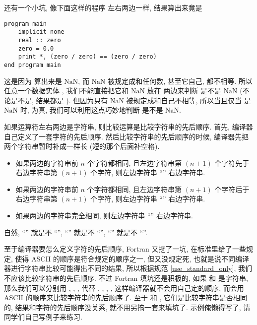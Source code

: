 还有一个小坑, 像下面这样的程序 \ttt{==} 左右两边一样, 结果算出来竟是 
\begin{lstlisting}
program main
    implicit none
    real :: zero
    zero = 0.0
    print *, (zero / zero) == (zero / zero)
end program main
\end{lstlisting}
这是因为  算出来是 $\text{NaN}$, 而 $\text{NaN}$ 被规定成和任何数, 甚至它自己, 都不相等. 所以任意一个数据实体 \ttt{[r]}, 我们不能直接把它和 $\text{NaN}$ 放在 \ttt{==} 两边来判断 \ttt{[r]} 是不是 $\text{NaN}$ (不论是不是, 结果都是 ). 但因为只有 $\text{NaN}$ 被规定成和自己不相等, 所以当且仅当 \ttt{[r]} 是 $\text{NaN}$ 时, \ttt{[r] /= [r]} 为真, 我们可以利用这点巧妙地判断 \ttt{[r]} 是不是 $\text{NaN}$.

如果运算符左右两边是字符串, 则比较运算是比较字符串的先后顺序. 首先, 编译器自己定义了一套字符的先后顺序. 然后比较字符串的先后顺序的时候, 编译器先把两个字符串暂时补成一样长 (短的那个后面补空格).
\begin{itemize}
    \item 如果两边的字符串前 $n$ 个字符都相同, 且左边字符串第 $(n+1)$ 个字符先于右边字符串第 $(n+1)$ 个字符, 则左边字符串 ``\ttt{<}'' 右边字符串.
    \item 如果两边的字符串前 $n$ 个字符都相同, 且左边字符串第 $(n+1)$ 个字符后于右边字符串第 $(n+1)$ 个字符, 则左边字符串 ``\ttt{>}'' 右边字符串.
    \item 如果两边的字符串完全相同, 则左边字符串 ``\ttt{==}'' 右边字符串.
\end{itemize}
自然, ``\ttt{>=}'' 就是不 ``\ttt{<}'', ``\ttt{<=}'' 就是不 ``\ttt{>}'', ``\ttt{/=}'' 就是不 ``\ttt{==}''.

至于编译器要怎么定义字符的先后顺序, Fortran 又挖了一坑, 在标准里给了一些规定, 使得 ASCII 的顺序是符合规定的顺序之一, 但又没规定死, 也就是说不同编译器进行字符串比较可能得出不同的结果, 所以根据规范 \ref{use_standard_only}, 我们不应该比较字符串的先后顺序. 不过 Fortran 填坑还是积极的, 如果 \ttt{[a]} 和 \ttt{[b]} 是字符串, 那么我们可以分别用 , , ,  代替 \ttt{[a] >= [b]}, \ttt{[a] > [b]}, \ttt{[a] <= [b]}, \ttt{[a] < [b]}, 这样编译器就不会用自己定的顺序, 而会用 ASCII 的顺序来比较字符串的先后顺序了. 至于 \ttt{[a] == [b]} 和 \ttt{[a] /= [b]}, 它们是比较字符串是否相同的, 结果和字符的先后顺序没关系, 就不用另搞一套来填坑了. 示例俺懒得写了, 请同学们自己写例子来练习.

